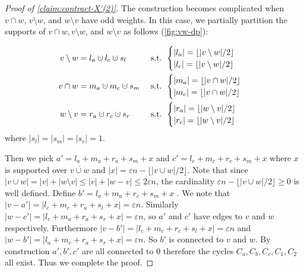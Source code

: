 \documentclass[10pt,a4paper]{article}
\newcommand{\prettyref}[1]{\cref{#1}}
\theoremstyle{definition}
\theoremstyle{remark}
\newcommand{\card}[1]{\lvert#1\rvert}
\renewcommand{\le}{\leqslant}
\renewcommand{\ge}{\geqslant}
\numberwithin{equation}{section}
\newcommand{\dunion}{\mathbin{\mathaccent\cdot\cup}}
\let\pref=\prettyref
\newcommand{\fl}[1]{\lfloor #1 \rfloor}
\begin{document}
\begin{proof}[Proof of \pref{claim:contract-X'(2)}]
The construction becomes complicated when $ v\cap w$, $v\setminus w$, and $w\setminus v$ have odd weights. In this case, we partially partition the supports of $v\cap w, v\setminus w$, and $w\setminus v$ as follows (\pref{fig:vw-dp}):

\begin{align*}
    v\setminus w &= l_a \dunion l_c \dunion s_l  &&\text{ s.t. } \begin{cases}
        \card{l_a} = \fl{\card{v\setminus w}/2}\\
        \card{l_c} = \fl{\card{v\setminus w}/2}
    \end{cases} \\
     v\cap w &= m_{a}\dunion m_{c}\dunion s_m &&\text{ s.t. } \begin{cases}
        \card{m_a} = \fl{\card{v\cap w}/2}\\
        \card{m_c} = \fl{\card{v\cap w}/2} 
    \end{cases} \\
     w\setminus v &= r_a \dunion r_c \dunion s_r &&\text{ s.t. } \begin{cases}
        \card{r_a} = \fl{\card{w\setminus v}/2}\\
        \card{r_c} = \fl{\card{w\setminus v}/2}
    \end{cases} 
\end{align*}
where $\card{s_l}=\card{s_m} = \card{s_r} =1$. 

Then we pick $a'=l_a + m_{a}+r_a+ s_m + x$ and $c'= l_c + m_{c}+r_c+s_m+x$ where $x$ is supported over $\overline{v \cup w}$ and $\card{x} = \varepsilon n - \fl{ \card{v\cup w}/2}$. Note that since $\card{v\cup w} = \card{v}+\card{w\setminus v} \le \card{v}+\card{w - v}  \le 2\varepsilon n$, the cardinality $\varepsilon n - \fl{\card{v\cup w}/2} \ge 0$ is well defined. Define $b' = l_a+m_{a}+r_c+ s_m + x$ 
. We note that $\card{v - a'} = \card{l_c+m_c+r_a+s_l+x} = \varepsilon n$. Similarly $\card{w - c'} = \card{l_c+m_a+r_a+s_r+x} = \varepsilon n$, so $a'$ and $c'$ have edges to $v$ and $w$ respectively. Furthermore $\card{ v - b'} = \card{l_c+m_c+r_c+s_l+x} = \varepsilon n$ and $\card{ w - b'} = \card{l_a + m_c+r_a+s_r+x} = \varepsilon n$. So $b'$ is connected to $v$ and $w$. By construction $a',b',c'$ are all connected to $0$ therefore the cycles $C_a,C_b,C_c,C_1,C_2$ all exist. Thus we complete the proof.
\end{proof}
\end{document}
